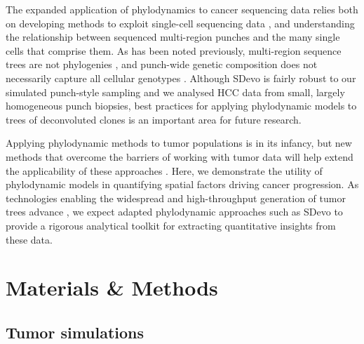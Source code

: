 \documentclass[12pt]{elife_based}
\begin{document}
The expanded application of phylodynamics to cancer sequencing data relies both on developing methods to exploit single-cell sequencing data \citep{chen2021ignoring, Moravec2021.01.07.425804}, and understanding the relationship between sequenced multi-region punches and the many single cells that comprise them. As has been noted previously, multi-region sequence trees are not phylogenies \citep{alves2017multiregional}, and punch-wide genetic composition does not necessarily capture all cellular genotypes \citep{caravagna2020subclonal}. Although SDevo is fairly robust to our simulated punch-style sampling and we analysed HCC data from small, largely homogeneous punch biopsies, best practices for applying phylodynamic models to trees of deconvoluted clones is an important area for future research. %
 
Applying phylodynamic methods to tumor populations is in its infancy, but new methods that overcome the barriers of working with tumor data will help extend the applicability of these approaches \citep{alves2018sensitivity, chen2021ignoring}. Here, we demonstrate the utility of phylodynamic models in quantifying spatial factors driving cancer progression. As technologies enabling the widespread and high-throughput generation of tumor trees advance \citep{yang2022lineage, lim2020advancing}, we expect adapted phylodynamic approaches such as SDevo to provide a rigorous analytical toolkit for extracting quantitative insights from these data.

\section*{Materials \& Methods}

\subsection*{Tumor simulations}
\end{document}

